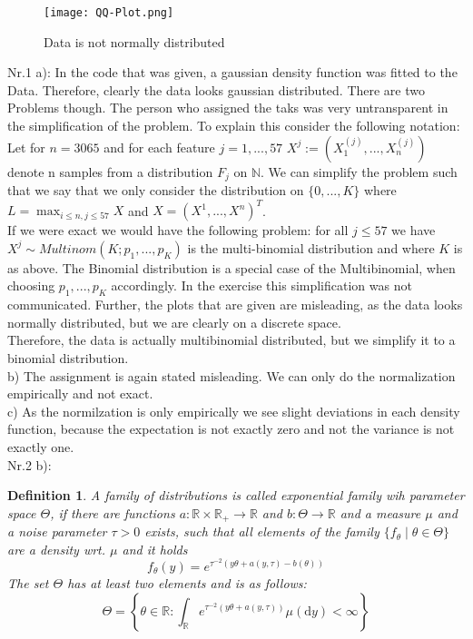 \documentclass[a4paper,oneside,bibliography=totoc]{scrartcl}
\newtheorem{defn}{Definition}[section] %
\begin{document}
\begin{figure}[H]
    \centering
    \texttt{[image: QQ-Plot.png]}
    \caption{Data is not normally distributed}
\end{figure}

Nr.1 a): In the code that was given, a gaussian density function was fitted to the Data. Therefore, clearly the data looks gaussian distributed. There are two Problems though. The person who assigned the taks was very untransparent in the simplification of the problem. To explain this consider the following notation:\\
Let for $n=3065$ and for each feature $j=1,...,57$ $X^j := (X_1^{(j)},...,X_n^{(j)})$ denote n samples from a distribution $F_j$ on $\mathbb{N}$. We can simplify the problem such that we say that we only consider the distribution on $\{ 0,..., K \}$ where $L=\max_{i\leq n , j \leq 57} X$ and $X= (X^1,...,X^n)^T$.\\
If we were exact we would have the following problem: for all $j \leq 57$ we have $X^j \sim Multinom(K;p_1,...,p_K)$ is the multi-binomial distribution and where $K$ is as above. The Binomial distribution is a special case of the Multibinomial, when choosing $p_1,...,p_K$ accordingly. In the exercise this simplification was not communicated. Further, the plots that are given are misleading, as the data looks normally distributed, but we are clearly on a discrete space.\\
Therefore, the data is actually multibinomial distributed, but we simplify it to a binomial distribution.\\
b) The assignment is again stated misleading. We can only do the normalization empirically and not exact.\\
c) As the normilzation is only empirically we see slight deviations in each density function, because the expectation is not exactly zero and not the variance is not exactly one.\\
Nr.2 b):
\begin{defn}
A family of distributions is called exponential family wih parameter space $\Theta$, if there are functions $a: \mathbb{R} \times \mathbb{R}_{+} \rightarrow \mathbb{R}$ and $b: \Theta \rightarrow \mathbb{R}$ and a measure $\mu$ and a noise parameter $\tau>0$ exists, such that all elements of the family $\{ f_\theta \mid \theta \in \Theta\}$ are a density wrt. $\mu$ and it holds
$$
f_\theta(y)=e^{\tau^{-2}(y \theta+a(y, \tau)-b(\theta))}
$$
The set $\Theta$ has at least two elements and is as follows:
$$
\Theta=\left\{\theta \in \mathbb{R}: \int_{\mathbb{R}} e^{\tau^{-2}(y \theta+a(y, \tau))} \mu(\mathrm{d} y)<\infty\right\}
$$
\end{defn}
\end{document}
